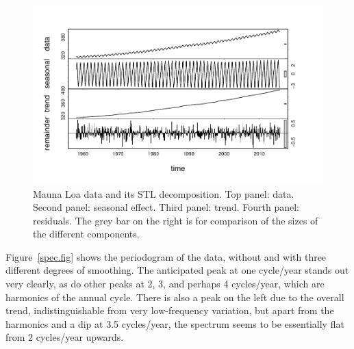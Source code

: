 \documentclass[a4paper,11pt]{article}\usepackage[]{graphicx}\usepackage[]{color}
\makeatletter
\def\maxwidth{ %
  \ifdim\Gin@nat@width>\linewidth
    \linewidth
  \else
    \Gin@nat@width
  \fi
}
\newenvironment{knitrout}{}{} %
\makeatother
\begin{document}
\begin{figure}[ht]
\begin{center}
\begin{knitrout}
\color{fgcolor}
\includegraphics[width=\maxwidth]{figure/CO2-STLdecomp-1} 

\end{knitrout}
\end{center}
\caption{Mauna Loa data and its STL decomposition.  Top panel: data. Second panel: seasonal effect.  Third panel: trend.  Fourth panel: residuals.  The grey bar on the right is for comparison of the sizes of the different components. }
\label{stl.fig}
\end{figure}

Figure~\ref{spec.fig} shows the periodogram of the data, without and with three different degrees of smoothing.  The anticipated peak at one cycle/year stands out very clearly, as do other peaks at 2, 3, and perhaps 4 cycles/year, which are harmonics of the annual cycle.  There is also a peak on the left due to the overall trend, indistinguishable from very low-frequency variation, but apart from the harmonics and a dip at 3.5 cycles/year, the spectrum seems to be essentially flat from 2 cycles/year upwards.  
\end{document}
